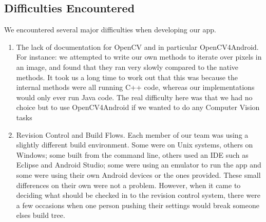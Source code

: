     \subsection{Difficulties Encountered}
    We encountered several major difficulties when developing our app.
    \begin{enumerate}
        \item{The lack of documentation for OpenCV and in particular OpenCV4Android. For instance: we attempted to write our own methods to iterate over pixels in an image, and found that they ran very slowly compared to the native methods. It took us a long time to work out that this was because the internal methods were all running C++ code, whereas our implementations would only ever run Java code. The real difficulty here was that we had no choice but to use
            OpenCV4Android if we wanted to do any Computer Vision tasks}
    \item{Revision Control and Build Flows. Each member of our team was using a slightly different build environment. Some were on Unix systems, others on Windows; some built from the command line, others used an IDE such as Eclipse and Android Studio; some were using an emulator to run the app and some were using their own Android devices or the ones provided. These small differences on their own were not a problem. However, when it came to deciding what should be checked in
            to the revision control system, there were a few occasions when one person pushing their settings would break someone elses build tree.} 



    \end{enumerate}

